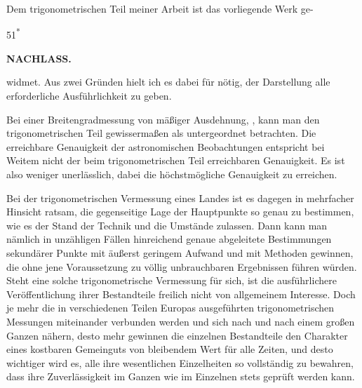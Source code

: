\par\noindent\hspace*{\parindent}Dem trigonometrischen Teil meiner Arbeit ist das vorliegende Werk ge-
\par\smallskip
\noindent\hfill{\small 51\textsuperscript{*}}\hspace*{.122\linewidth}\par\clearpage

\noindent{}\hfill{\small\textbf{NACHLASS.}}\hfill\null\par\medskip
\noindent widmet. Aus zwei Gründen hielt ich es dabei für nötig, der Darstellung
alle erforderliche Ausführlichkeit zu geben.

\par\noindent\hspace*{\parindent}Bei einer  Breitengradmessung von mäßiger Ausdehnung,
, kann man den
trigonometrischen Teil gewissermaßen als untergeordnet betrachten. Die
erreichbare Genauigkeit der astronomischen Beobachtungen entspricht bei
Weitem nicht der beim trigonometrischen Teil erreichbaren Genauigkeit.
Es ist also weniger unerlässlich, dabei die höchstmögliche Genauigkeit zu erreichen.

\par\noindent\hspace*{\parindent}Bei der trigonometrischen Vermessung eines Landes ist es dagegen in
mehrfacher Hinsicht ratsam, die gegenseitige Lage der Hauptpunkte so genau
zu bestimmen, wie es der Stand der Technik und die Umstände zulassen.
Dann kann man nämlich in unzähligen Fällen hinreichend genaue abgeleitete
Bestimmungen sekundärer Punkte mit äußerst geringem Aufwand und mit Methoden
gewinnen, die ohne jene Voraussetzung zu völlig unbrauchbaren Ergebnissen führen
würden. Steht eine solche trigonometrische Vermessung für sich, ist die
ausführlichere Veröffentlichung ihrer Bestandteile freilich nicht von allgemeinem
Interesse. Doch je mehr die in verschiedenen Teilen Europas ausgeführten
trigonometrischen Messungen miteinander verbunden werden und sich nach und nach
einem großen Ganzen nähern, desto mehr gewinnen die einzelnen Bestandteile
den Charakter eines kostbaren Gemeinguts von bleibendem Wert für alle Zeiten,
und desto wichtiger wird es, alle ihre wesentlichen Einzelheiten so vollständig
zu bewahren, dass ihre Zuverlässigkeit im Ganzen wie im Einzelnen stets
geprüft werden kann.

